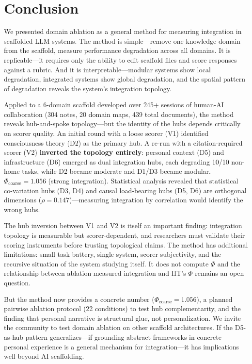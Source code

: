 \documentclass[12pt,letterpaper]{article}
\begin{document}
\section{Conclusion}
\label{sec:conclusion}

We presented domain ablation as a general method for measuring integration in scaffolded LLM systems. The method is simple---remove one knowledge domain from the scaffold, measure performance degradation across all domains. It is replicable---it requires only the ability to edit scaffold files and score responses against a rubric. And it is interpretable---modular systems show local degradation, integrated systems show global degradation, and the spatial pattern of degradation reveals the system's integration topology.

Applied to a 6-domain scaffold developed over 245+ sessions of human-AI collaboration (304 notes, 20 domain maps, 439 total documents), the method reveals hub-and-spoke topology---but the identity of the hubs depends critically on scorer quality. An initial round with a loose scorer (V1) identified consciousness theory (D2) as the primary hub. A re-run with a citation-required scorer (V2) \textbf{inverted the topology entirely}: personal context (D5) and infrastructure (D6) emerged as dual integration hubs, each degrading 10/10 non-home tasks, while D2 became moderate and D1/D3 became modular. $\Phi_{\text{coarse}} = 1.056$ (strong integration). Statistical analysis revealed that statistical co-variation hubs (D3, D4) and causal load-bearing hubs (D5, D6) are orthogonal dimensions ($\rho = 0.147$)---measuring integration by correlation would identify the wrong hubs.

The hub inversion between V1 and V2 is itself an important finding: integration topology is measurable but scorer-dependent, and researchers must validate their scoring instruments before trusting topological claims. The method has additional limitations: small task battery, single system, scorer subjectivity, and the recursive situation of the system studying itself. It does not compute $\Phi$ and the relationship between ablation-measured integration and IIT's $\Phi$ remains an open question.

But the method now provides a concrete number ($\Phi_{\text{coarse}} = 1.056$), a planned pairwise ablation protocol (22 conditions) to test hub complementarity, and the finding that personal narrative is structural glue, not personalization. We invite the community to test domain ablation on other scaffold architectures. If the D5-as-hub pattern generalizes---if grounding abstract frameworks in concrete personal experience is a general mechanism for integration---it has implications well beyond AI scaffolding.
\end{document}
